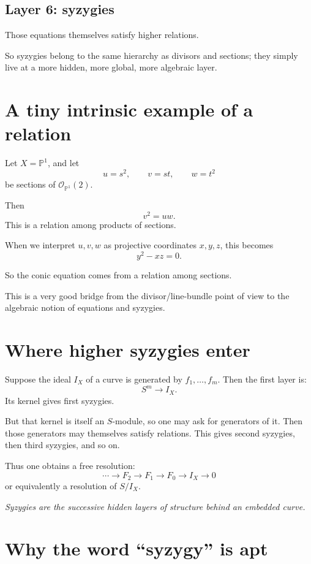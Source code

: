 \documentclass[11pt]{article}
\theoremstyle{definition}
\theoremstyle{remark}
\newcommand{\PP}{\mathbb{P}}
\newcommand{\cO}{\mathcal{O}}
\begin{document}
	\subsection*{Layer 6: syzygies}
	Those equations themselves satisfy higher relations.
	
	So syzygies belong to the same hierarchy as divisors and sections; they simply live at a more hidden, more global, more algebraic layer.
	
	\section{A tiny intrinsic example of a relation}
	
	Let \(X=\PP^1\), and let
	\[
	u=s^2,\qquad v=st,\qquad w=t^2
	\]
	be sections of \(\cO_{\PP^1}(2)\).
	
	Then
	\[
	v^2=uw.
	\]
	This is a relation among products of sections.
	
	When we interpret \(u,v,w\) as projective coordinates \(x,y,z\), this becomes
	\[
	y^2-xz=0.
	\]
	
	So the conic equation comes from a relation among sections.
	
	This is a very good bridge from the divisor/line-bundle point of view to the algebraic notion of equations and syzygies.
	
	\section{Where higher syzygies enter}
	
	Suppose the ideal \(I_X\) of a curve is generated by \(f_1,\dots,f_m\). Then the first layer is:
	\[
	S^m \to I_X.
	\]
	Its kernel gives first syzygies.
	
	But that kernel is itself an \(S\)-module, so one may ask for generators of it. Then those generators may themselves satisfy relations. This gives second syzygies, then third syzygies, and so on.
	
	Thus one obtains a free resolution:
	\[
	\cdots \to F_2\to F_1\to F_0\to I_X\to 0
	\]
	or equivalently a resolution of \(S/I_X\).
	
	\begin{center}
		\emph{Syzygies are the successive hidden layers of structure behind an embedded curve.}
	\end{center}
	
	\section{Why the word ``syzygy'' is apt}
	
\end{document}
